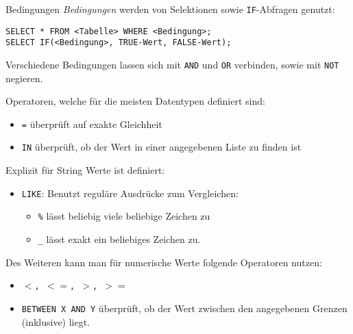 \begin{code}{Bedingungen}
    \emph{Bedingungen} werden von Selektionen sowie \texttt{IF}-Abfragen genutzt:

    \begin{verbatim}
SELECT * FROM <Tabelle> WHERE <Bedingung>;
SELECT IF(<Bedingung>, TRUE-Wert, FALSE-Wert);
    \end{verbatim}

    Verschiedene Bedingungen lassen sich mit \texttt{AND} und \texttt{OR} verbinden, sowie mit \texttt{NOT} negieren.

    Operatoren, welche für die meisten Datentypen definiert sind:

    \begin{itemize}
        \item \texttt{=} überprüft auf exakte Gleichheit
        \item \texttt{IN} überprüft, ob der Wert in einer angegebenen Liste zu finden ist
    \end{itemize}

    Explizit für String Werte ist definiert:

    \begin{itemize}
        \item \texttt{LIKE}: Benutzt reguläre Ausdrücke zum Vergleichen:
            \begin{itemize}
                \item \texttt{\%} lässt beliebig viele beliebige Zeichen zu
                \item \texttt{\_} lässt exakt ein beliebiges Zeichen zu.
            \end{itemize}
    \end{itemize}

    Des Weiteren kann man für numerische Werte folgende Operatoren nutzen:

    \begin{itemize}
        \item \texttt{$<$, $<=$, $>$, $>=$}
        \item \texttt{BETWEEN X AND Y} überprüft, ob der Wert zwischen den angegebenen Grenzen (inklusive) liegt.
    \end{itemize}
\end{code}

